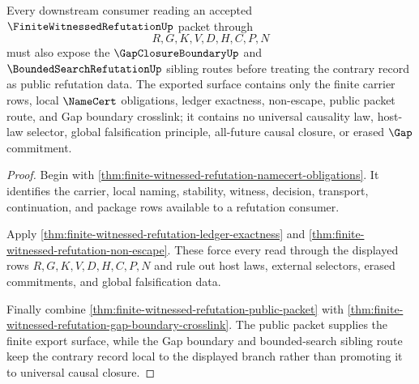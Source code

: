\begin{theorem}
\label{thm:finite-witnessed-refutation-public-consumer-export}
Every downstream consumer reading an accepted $\FiniteWitnessedRefutationUp$ packet through
$$
R,G,K,V,D,H,C,P,N
$$
must also expose the $\GapClosureBoundaryUp$ and $\BoundedSearchRefutationUp$ sibling routes before treating the contrary record as public refutation data. The exported surface contains only the finite carrier rows, local $\NameCert$ obligations, ledger exactness, non-escape, public packet route, and Gap boundary crosslink; it contains no universal causality law, host-law selector, global falsification principle, all-future causal closure, or erased $\Gap$ commitment.
\end{theorem}
\begin{proof}
Begin with \autoref{thm:finite-witnessed-refutation-namecert-obligations}. It identifies the carrier, local naming, stability, witness, decision, transport, continuation, and package rows available to a refutation consumer.

Apply \autoref{thm:finite-witnessed-refutation-ledger-exactness} and \autoref{thm:finite-witnessed-refutation-non-escape}. These force every read through the displayed rows $R,G,K,V,D,H,C,P,N$ and rule out host laws, external selectors, erased commitments, and global falsification data.

Finally combine \autoref{thm:finite-witnessed-refutation-public-packet} with \autoref{thm:finite-witnessed-refutation-gap-boundary-crosslink}. The public packet supplies the finite export surface, while the Gap boundary and bounded-search sibling route keep the contrary record local to the displayed branch rather than promoting it to universal causal closure.
\end{proof}

